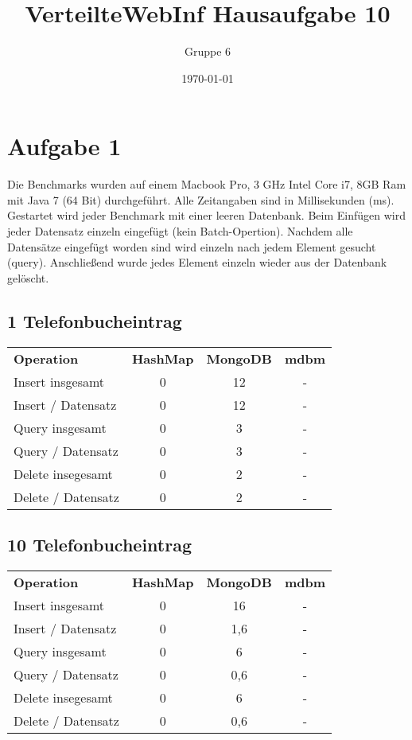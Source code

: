 \documentclass[a4paper]{scrartcl}
\author{Gruppe 6}
\title{\textbf{VerteilteWebInf Hausaufgabe 10}}
\date{\today}
\begin{document}
\maketitle

\section*{Aufgabe 1}

Die Benchmarks wurden auf einem Macbook Pro, 3 GHz Intel Core i7, 8GB Ram mit Java 7 (64 Bit) durchgeführt. Alle Zeitangaben sind in Millisekunden (ms). Gestartet wird jeder Benchmark mit einer leeren Datenbank. Beim Einfügen wird jeder Datensatz einzeln eingefügt (kein Batch-Opertion). Nachdem alle Datensätze eingefügt worden sind wird einzeln nach jedem Element gesucht (query). Anschließend wurde jedes Element einzeln wieder aus der Datenbank gelöscht.

\subsection*{1 Telefonbucheintrag} 
\begin{tabular}{lccc}
\textbf{Operation} & \textbf{HashMap}  & \textbf{MongoDB}  & \textbf{mdbm} 	\\
Insert insgesamt &  0 & 12  & - \\
Insert / Datensatz & 0 & 12 & - \\
Query insgesamt & 0 & 3 & - \\
Query / Datensatz & 0 & 3 & - \\
Delete insegesamt & 0 & 2 & - \\
Delete / Datensatz & 0 & 2 & -
\end{tabular}


\subsection*{10 Telefonbucheintrag} 
\begin{tabular}{lccc}
\textbf{Operation} & \textbf{HashMap}  & \textbf{MongoDB}  & \textbf{mdbm} 	\\
Insert insgesamt &  0 & 16  & - \\
Insert / Datensatz & 0 & 1,6 & - \\
Query insgesamt & 0 & 6 & - \\
Query / Datensatz & 0 & 0,6 & - \\
Delete insegesamt & 0 & 6 & - \\
Delete / Datensatz & 0 & 0,6 & -
\end{tabular}
\end{document}

